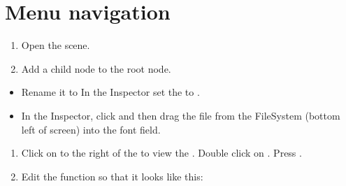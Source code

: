 \documentclass[a4paper,12pt,english]{sphinxmanual}
\begin{document}
\section{Menu navigation}
\label{\detokenize{tutorial:menu-navigation}}\begin{enumerate}
%
\item {} 
\sphinxAtStartPar
Open the  scene.

\item {} 
\sphinxAtStartPar
Add a  child node to the root node.

\end{enumerate}
\begin{itemize}
\item {} 
\sphinxAtStartPar
Rename it to  In the Inspector set the  to
.

\item {} 
\sphinxAtStartPar
In the Inspector, click  and then drag the
 file from the FileSystem (bottom left of screen) into
the \sphinxstylestrong{{[}empty{]}} font field.

\sphinxAtStartPar
{}

\end{itemize}
\begin{enumerate}
%
\setcounter{enumi}{2}
\item {} 
\sphinxAtStartPar
Click on  to the right of the  to view the
. Double click on . Press .

\item {} 
\sphinxAtStartPar
Edit the function so that it looks like this:

\end{enumerate}
\end{document}
